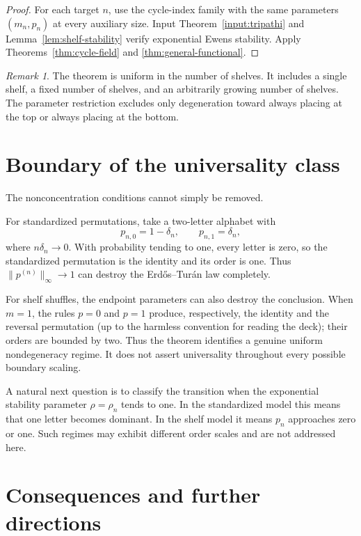 \documentclass[11pt]{article}
\theoremstyle{definition}
\theoremstyle{remark}
\newtheorem{remark}[theorem]{Remark}
\begin{document}
\begin{proof}
For each target $n$, use the cycle-index family with the same parameters
$(m_n,p_n)$ at every auxiliary size.  Input
Theorem~\ref{input:tripathi} and
Lemma~\ref{lem:shelf-stability} verify exponential Ewens stability.
Apply Theorems~\ref{thm:cycle-field} and
\ref{thm:general-functional}.
\end{proof}

\begin{remark}
The theorem is uniform in the number of shelves.  It includes a single
shelf, a fixed number of shelves, and an arbitrarily growing number of
shelves.  The parameter restriction excludes only degeneration toward
always placing at the top or always placing at the bottom.
\end{remark}

\section{Boundary of the universality class}

The nonconcentration conditions cannot simply be removed.

For standardized permutations, take a two-letter alphabet with
\[
 p_{n,0}=1-\delta_n,\qquad p_{n,1}=\delta_n,
\]
where $n\delta_n\to0$.  With probability tending to one, every letter is
zero, so the standardized permutation is the identity and its order is
one.  Thus $\|p^{(n)}\|_\infty\to1$ can destroy the Erd\H{o}s--Tur\'an
law completely.

For shelf shuffles, the endpoint parameters can also destroy the
conclusion.  When $m=1$, the rules $p=0$ and $p=1$ produce, respectively,
the identity and the reversal permutation (up to the harmless convention
for reading the deck); their orders are bounded by two.  Thus the theorem
identifies a genuine uniform nondegeneracy regime.  It does not assert
universality throughout every possible boundary scaling.

A natural next question is to classify the transition when the exponential
stability parameter $\rho=\rho_n$ tends to one.  In the standardized model
this means that one letter becomes dominant.  In the shelf model it means
$p_n$ approaches zero or one.  Such regimes may exhibit different order
scales and are not addressed here.

\section{Consequences and further directions}
\end{document}

